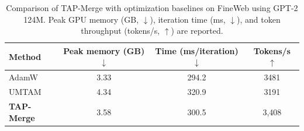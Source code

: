 \begin{table}[t]
\centering\small
\caption{Comparison of TAP-Merge with optimization baselines on FineWeb using GPT-2 124M. Peak GPU memory (GB, $\downarrow$), iteration time (ms, $\downarrow$), and token throughput (tokens/s, $\uparrow$) are reported.}
\label{tab:fineweb_memory}
\begin{tabular}{lccc}
\toprule
Method & Peak memory (GB) $\downarrow$ & Time (ms/iteration) $\downarrow$
& Tokens/s $\uparrow$\\
\midrule
AdamW & 3.33 & 294.2 & 3481\\
UMTAM~\cite{umtam2026} & 4.34 & 320.9 & 3191\\
\midrule
\textbf{TAP-Merge} & 3.58 & 300.5 & 3{,}408\\ \bottomrule
\end{tabular}
\end{table}
